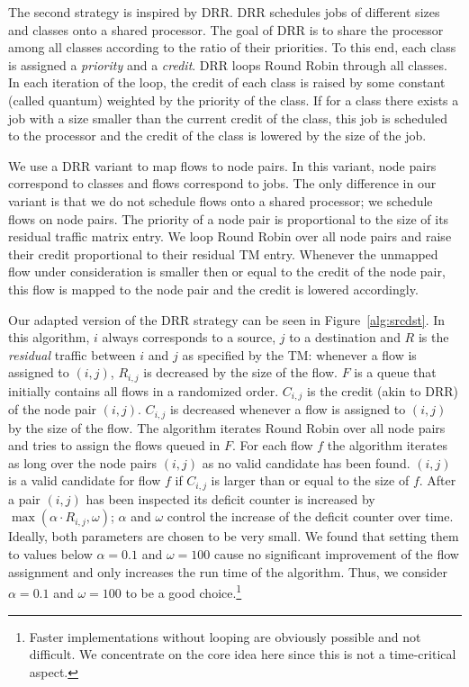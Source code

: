 \documentclass[journal,10pt]{IEEEtran}
\begin{document}
The second strategy is inspired by DRR. DRR schedules jobs of different sizes and classes onto a shared processor.
The goal of DRR is to share the processor among all classes according to the ratio of their priorities. 
To this end, each class is assigned a \emph{priority} and a \emph{credit}. 
DRR loops Round Robin through all classes. 
In each iteration of the loop, the credit of each class is raised by some constant (called quantum) weighted by the priority of the class.
If for a class there exists a job with a size smaller than the current credit of the class,
this job is scheduled to the processor and the credit of the class is lowered by the size of the job.


We use a DRR variant to map flows to node pairs. 
In this variant, node pairs correspond to classes and
flows correspond to jobs. The only difference in our variant is that we do not schedule flows onto a shared processor; we schedule flows on node pairs.
The priority of a node pair is proportional to the size of its residual traffic matrix entry.
We loop Round Robin over all node pairs and raise their credit proportional to their residual TM entry.
Whenever the unmapped flow under consideration is smaller then or equal to the credit of the node pair, this flow is mapped to the node pair and the 
credit is lowered accordingly.

Our adapted version of the DRR strategy can be seen in Figure~\ref{alg:srcdst}. 
In this algorithm, $i$ always corresponds to a source, $j$ to a destination and
$R$ is the \emph{residual} traffic between $i$ and $j$ as specified by the TM:
whenever a flow is assigned to $(i,j)$, $R_{i,j}$ is decreased by the size of the flow.
$F$ is a queue that initially contains all flows in a randomized order.
$C_{i,j}$ is the credit (akin to DRR) of the node pair $(i,j)$. 
$C_{i,j}$ is decreased whenever a flow is assigned to $(i,j)$
by the size of the flow. 
The algorithm iterates Round Robin over all node pairs and tries to assign the flows queued in $F$.
For each flow $f$ the algorithm iterates as long over the node pairs $(i,j)$ as no valid candidate has been found. 
$(i,j)$ is a valid candidate for flow $f$ if $C_{i,j}$ is larger than or equal to the size of $f$.
After a pair $(i,j)$ has been inspected its deficit counter is increased by $\max(\alpha \cdot R_{i,j}, \omega)$;
$\alpha$ and $\omega$ control the increase of the deficit counter over time.
Ideally, both parameters are chosen to be very small. 
We found that setting them to values below $\alpha=0.1$ and $\omega=100$ cause no significant improvement of the flow assignment and 
only increases the run time of the algorithm. Thus, we consider $\alpha=0.1$ and $\omega=100$ to be a good choice.\footnote{Faster implementations without looping are obviously possible and not difficult. 
We concentrate on the core idea here since this is not a time-critical aspect.}
\end{document}
